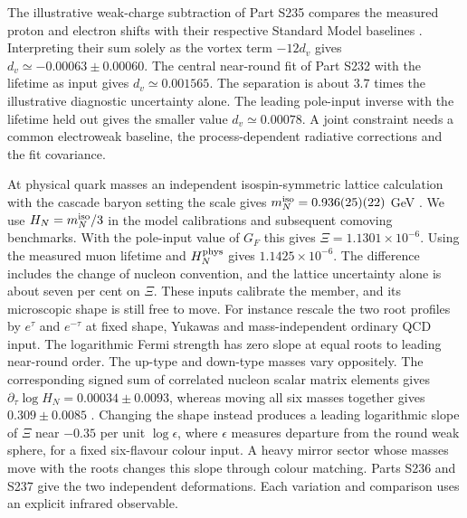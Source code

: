\documentclass[aps,prd,reprint,onecolumn,nofootinbib,amsmath,amssymb]{revtex4-2}
\begin{document}
The illustrative weak-charge subtraction of Part S235 compares the measured proton and electron shifts with their respective Standard Model baselines \cite{Qweak2018,E1582005}. Interpreting their sum solely as the vortex term $-12d_v$ gives $d_v\simeq-0.00063\pm0.00060$. The central near-round fit of Part S232 with the lifetime as input gives $d_v\simeq0.001565$. The separation is about $3.7$ times the illustrative diagnostic uncertainty alone. The leading pole-input inverse with the lifetime held out gives the smaller value $d_v\simeq0.00078$. A joint constraint needs a common electroweak baseline, the process-dependent radiative corrections and the fit covariance.

At physical quark masses an independent isospin-symmetric lattice calculation with the cascade baryon setting the scale gives $m_N^{\rm iso}=0.936(25)(22)$ GeV \cite{Durr2008Hadron}. We use $H_N=m_N^{\rm iso}/3$ in the model calibrations and subsequent comoving benchmarks. With the pole-input value of $G_F$ this gives $\Xi=1.1301\times10^{-6}$. Using the measured muon lifetime and $H_N^{\rm phys}$ gives $1.1425\times10^{-6}$. The difference includes the change of nucleon convention, and the lattice uncertainty alone is about seven per cent on $\Xi$. These inputs calibrate the member, and its microscopic shape is still free to move. For instance rescale the two root profiles by $e^\tau$ and $e^{-\tau}$ at fixed shape, Yukawas and mass-independent ordinary QCD input. The logarithmic Fermi strength has zero slope at equal roots to leading near-round order. The up-type and down-type masses vary oppositely. The corresponding signed sum of correlated nucleon scalar matrix elements gives $\partial_\tau\log H_N=0.00034\pm0.0093$, whereas moving all six masses together gives $0.309\pm0.0085$ \cite{Borsanyi2020Nucleon}. Changing the shape instead produces a leading logarithmic slope of $\Xi$ near $-0.35$ per unit $\log\epsilon$, where $\epsilon$ measures departure from the round weak sphere, for a fixed six-flavour colour input. A heavy mirror sector whose masses move with the roots changes this slope through colour matching. Parts S236 and S237 give the two independent deformations. Each variation and comparison uses an explicit infrared observable.
\end{document}
